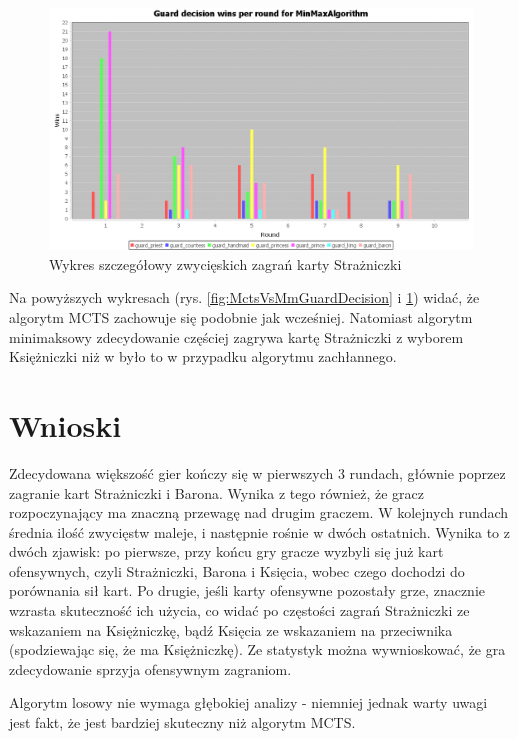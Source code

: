 \begin{figure}[H]
	\centering
	\includegraphics[width=\textwidth]{Resources/MirrorMmVsMcts/MmVsMctsGuardDecision.PNG}
	\caption{Wykres szczegółowy zwycięskich zagrań karty Strażniczki} 
	\label{fig:MmVsMctsGuardDecision}
\end{figure}

Na powyższych wykresach (rys. \ref{fig:MctsVsMmGuardDecision} i \ref{fig:MmVsMctsGuardDecision}) widać, że algorytm MCTS zachowuje się podobnie jak wcześniej. Natomiast algorytm minimaksowy zdecydowanie częściej zagrywa kartę Strażniczki z wyborem Księżniczki niż w było to w przypadku algorytmu zachłannego.

\section{Wnioski}
Zdecydowana większość gier kończy się w pierwszych 3 rundach, głównie poprzez zagranie kart Strażniczki i Barona. Wynika z tego również, że gracz rozpoczynający ma znaczną przewagę nad drugim graczem. W kolejnych rundach średnia ilość zwycięstw maleje, i następnie rośnie w dwóch ostatnich. Wynika to z dwóch zjawisk: po pierwsze, przy końcu gry gracze wyzbyli się już kart ofensywnych, czyli Strażniczki, Barona i Księcia, wobec czego dochodzi do porównania sił kart. Po drugie, jeśli karty ofensywne pozostały grze, znacznie wzrasta skuteczność ich użycia, co widać po częstości zagrań Strażniczki ze wskazaniem na Księżniczkę, bądź Księcia ze wskazaniem na przeciwnika (spodziewając się, że ma Księżniczkę). Ze statystyk można wywnioskować, że gra zdecydowanie sprzyja ofensywnym zagraniom.

Algorytm losowy nie wymaga głębokiej analizy - niemniej jednak warty uwagi jest fakt, że jest bardziej skuteczny niż algorytm MCTS.

